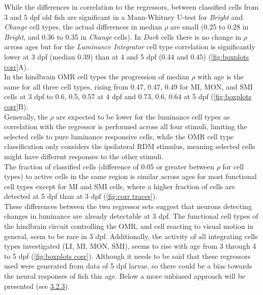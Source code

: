 \documentclass[12pt, a4paper, oneside]{article}
\begin{document}
While the differences in correlation to the regressors, between classified cells from 3 and 5 dpf old fish are significant in a Mann-Whitney U-test for \textit{Bright} and \textit{Change} cell types, the actual differences in median $\rho$ are small (0.25 to 0.28 in \textit{Bright}, and 0.36 to 0.35 in
\textit{Change} cells). In \textit{Dark} cells there is no change in $\rho$ across ages but for the \textit{Luminance Integrator} cell type correlation is significantly lower at 3 dpf (median 0.39) than at 4 and 5 dpf (0.44 and 0.45) (\autoref{fig:boxplots corr}A).\\
In the hindbrain OMR cell types the progression of median $\rho$ with age is the same for all three cell types, rising from 0.47, 0.47, 0.49 for MI, MON, and SMI cells at 3 dpf to 0.6, 0.5, 0.57 at 4 dpf and 0.73, 0.6, 0.64 at 5 dpf (\autoref{fig:boxplots corr}B).\\
Generally, the $\rho$ are expected to be lower for the luminance cell types as correlation with the regressor is performed across all four stimuli, limiting the selected cells to pure luminance responsive cells, while the OMR cell type classification only considers the ipsilateral RDM stimulus, meaning selected cells might have different responses to the other stimuli. \\
The fraction of classified cells (difference of 0.05 or greater between $\rho$ for cell types) to active cells in the same region is similar across ages for most functional cell types except for MI and SMI cells, where a higher fraction of cells are detected at 5 dpf than at 3 dpf (\autoref{fig:corr traces}).\\

These differences between the two regressor sets suggest that neurons detecting changes in luminance are already detectable at 3 dpf. 
The functional cell types of the hindbrain circuit controlling the OMR, and cell reacting to visual motion in general, seem to be rare in 3 dpf. Additionally, the activity of all integrating cells types investigated (LI, MI, MON, SMI), seems to rise with age from 3 through 4 to 5 dpf (\autoref{fig:boxplots corr}). Although it needs to be said that these regressors used were generated from data of 5 dpf larvae, so there could be a bias towards the neural responses of fish this age. Below a more unbiased approach will be presented (see \hyperref[sec:met clustering]{3.2.3}).\\
\end{document}
